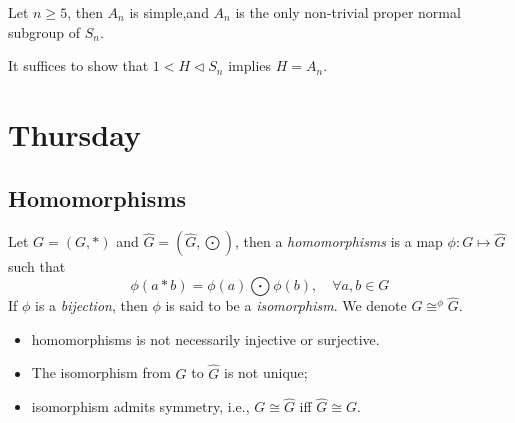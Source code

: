 \begin{theorem}
Let $n\ge5$, then $A_n$ is simple,and $A_n$ is the only non-trivial proper normal subgroup of $S_n$.
\end{theorem}
It suffices to show that $1<H\triangleleft S_n$ implies $H=A_n$.


\section{Thursday}
\subsection{Homomorphisms}
\begin{definition}[Homomorphisms]
Let $G=(G,*)$ and $\hat G=(\hat G,\bigodot)$, then a \emph{homomorphisms} is a map $\phi: G\mapsto \hat G$ such that
\[
\phi(a*b) = \phi(a)\bigodot \phi(b),\quad
\forall a,b\in G
\]
If $\phi$ is a \emph{bijection}, then $\phi$ is said to be a \emph{isomorphism}. We denote $G\cong^{\phi} \hat G$.
\end{definition}
\begin{remark}
\begin{itemize}
\item
homomorphisms is not necessarily injective or surjective.
\item
The isomorphism from $G$ to $\hat G$ is not unique;
\item
 isomorphism admits symmetry, i.e., $G\cong \hat G$ iff $\hat G\cong G$.
\end{itemize}
\end{remark}
